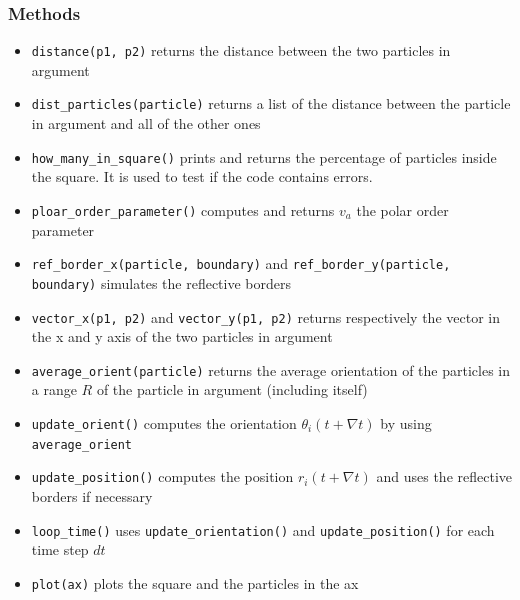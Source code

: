\documentclass{article}
\begin{document}
\subsubsection*{Methods}
\begin{itemize}
    \item \texttt{distance(p1, p2)} returns the distance between the two particles in argument
    \item \texttt{dist\_particles(particle)} returns a list of the distance between the particle in argument and all of the other ones
    \item \texttt{how\_many\_in\_square()} prints and returns the percentage of particles inside the square. It is
    used to test if the code contains errors.
    \item \texttt{ploar\_order\_parameter()} computes and returns $v_a$ the polar order parameter
    \item \texttt{ref\_border\_x(particle, boundary)} and \texttt{ref\_border\_y(particle, boundary)}
    simulates the reflective borders
    \item \texttt{vector\_x(p1, p2)} and \texttt{vector\_y(p1, p2)} returns respectively the vector in the x and y axis of the
    two particles in argument
    \item \texttt{average\_orient(particle)} returns the average orientation of the particles in a range $R$ of the particle in argument (including itself)
    \item \texttt{update\_orient()} computes the orientation $\theta_i(t + \nabla t)$ by using \texttt{average\_orient}
    \item \texttt{update\_position()} computes the position $r_i(t + \nabla t)$ and uses the reflective borders if necessary
    \item \texttt{loop\_time()} uses \texttt{update\_orientation()} and \texttt{update\_position()} for each time step $dt$
    \item \texttt{plot(ax)} plots the square and the particles in the ax
\end{itemize}

\newpage
\end{document}
